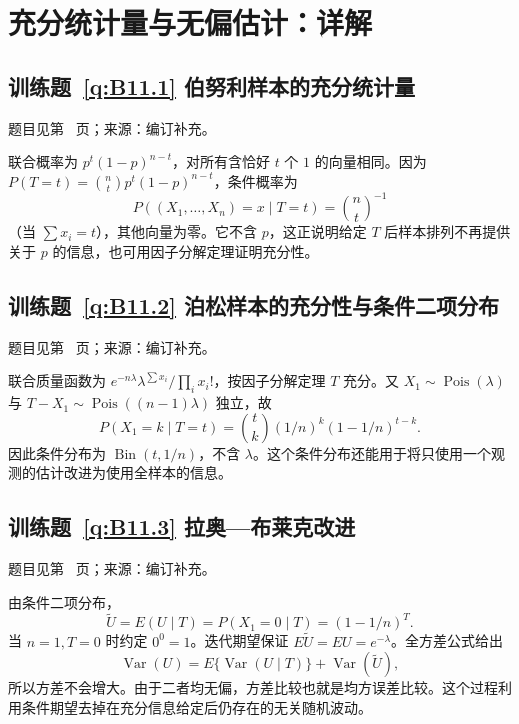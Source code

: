 \documentclass[UTF8,12pt,a4paper,fontset=fandol]{ctexbook}
\begin{document}
\clearpage\section*{充分统计量与无偏估计：详解}

\subsection*{训练题~\ref{q:B11.1} 伯努利样本的充分统计量}\label{a:B11.1}{\small 题目见第~\pageref{q:B11.1} 页；来源：编订补充。}
\begin{solve}联合概率为 $p^t(1-p)^{n-t}$，对所有含恰好 $t$ 个 $1$ 的向量相同。因为 $P(T=t)=\binom nt p^t(1-p)^{n-t}$，条件概率为\[P((X_1,\ldots,X_n)=x\mid T=t)=\binom nt^{-1}\]（当 $\sum x_i=t$），其他向量为零。它不含 $p$，这正说明给定 $T$ 后样本排列不再提供关于 $p$ 的信息，也可用因子分解定理证明充分性。\end{solve}

\subsection*{训练题~\ref{q:B11.2} 泊松样本的充分性与条件二项分布}\label{a:B11.2}{\small 题目见第~\pageref{q:B11.2} 页；来源：编订补充。}
\begin{solve}联合质量函数为 $e^{-n\lambda}\lambda^{\sum x_i}/\prod_i x_i!$，按因子分解定理 $T$ 充分。又 $X_1\sim\operatorname{Pois}(\lambda)$ 与 $T-X_1\sim\operatorname{Pois}((n-1)\lambda)$ 独立，故\[P(X_1=k\mid T=t)=\binom tk(1/n)^k(1-1/n)^{t-k}.\]因此条件分布为 $\operatorname{Bin}(t,1/n)$，不含 $\lambda$。这个条件分布还能用于将只使用一个观测的估计改进为使用全样本的信息。\end{solve}

\subsection*{训练题~\ref{q:B11.3} 拉奥—布莱克改进}\label{a:B11.3}{\small 题目见第~\pageref{q:B11.3} 页；来源：编订补充。}
\begin{solve}由条件二项分布，\[\widetilde U=E(U\mid T)=P(X_1=0\mid T)=(1-1/n)^T.\]当 $n=1,T=0$ 时约定 $0^0=1$。迭代期望保证 $E\widetilde U=EU=e^{-\lambda}$。全方差公式给出\[\operatorname{Var}(U)=E\{\operatorname{Var}(U\mid T)\}+\operatorname{Var}(\widetilde U),\]所以方差不会增大。由于二者均无偏，方差比较也就是均方误差比较。这个过程利用条件期望去掉在充分信息给定后仍存在的无关随机波动。\end{solve}
\end{document}

